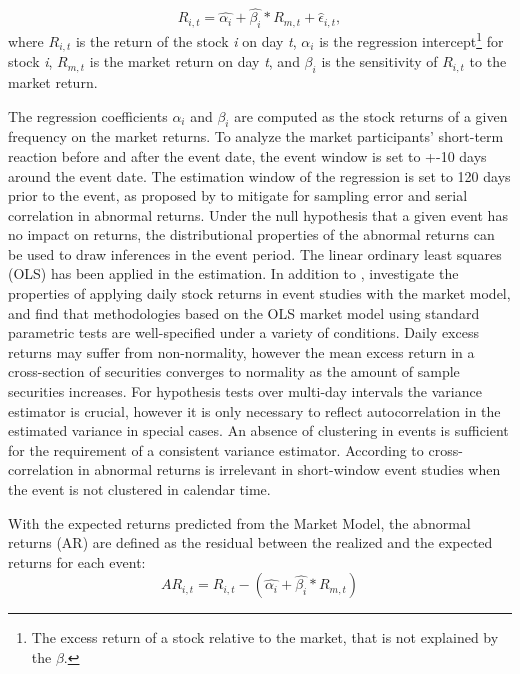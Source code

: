 \begin{equation} \label{market_model}
    R_{i,t} = \hat{\alpha_i} + \hat{\beta_i} * R_{m,t} + \hat{\epsilon}_{i,t},
\end{equation}
 where $R_{i,t}$ is the return of the stock \textit{i} on day \textit{t}, $\alpha_i$ is the regression intercept\footnote{The excess return of a stock relative to the market, that is not explained by the $\beta$.} for stock \textit{i}, $R_{m,t}$ is the market return on day \textit{t}, and
 $\beta_i$ is the sensitivity of $R_{i,t}$ to the market return.  

 The regression coefficients $\alpha_i$ and $\beta_i$ are computed as the stock returns of a given frequency on the market returns. To analyze the market participants' short-term reaction before and after the event date, the event window is set to +-10 days around the event date. The estimation window of the regression is set to 120 days prior to the event, as proposed by \cite{Event_studies} to mitigate for sampling error and serial correlation in abnormal returns. Under the null hypothesis that a given event has no impact on returns, the distributional properties of the abnormal returns can be used to draw inferences in the event period. 
 The linear ordinary least squares (OLS) has been applied in the estimation. In addition to \cite{Event_studies},\cite{brown1985using} investigate the properties of applying daily stock returns in event studies with the market model, and find that methodologies based on the OLS market model using standard parametric tests are well-specified under a variety of conditions. Daily excess returns may suffer from non-normality, however the mean excess return in a cross-section of securities converges to normality as the amount of sample securities increases. For hypothesis tests over multi-day intervals the variance estimator is crucial, however it is only necessary to reflect autocorrelation in the estimated variance in special cases. An absence of clustering in events is sufficient for the requirement of a consistent variance estimator. According to \cite{kothari} cross-correlation in abnormal returns is irrelevant in short-window event studies when the event is not clustered in calendar time.

 With the expected returns predicted from the Market Model, the abnormal returns (AR) are defined as the residual between the realized and the expected returns for each event:
 \begin{equation}
    AR_{i,t} = R_{i,t} - (\hat{\alpha_i} + \hat{\beta_i} * R_{m,t})
 \end{equation}

